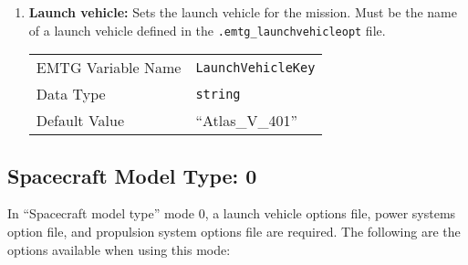 \begin{enumerate}
    \item \textbf{Launch vehicle:} Sets the launch vehicle for the mission. Must be the name of a launch vehicle defined in the {\tt .emtg\_launchvehicleopt} file.
    \begin{table}[H]
        \hspace{2cm}
        \begin{tabular}{lp{5cm}}
        \ac{EMTG} Variable Name & \verb|LaunchVehicleKey| \\
        Data Type & \verb|string| \\
        Default Value & ``Atlas\_V\_401'' \\
        \end{tabular}
    \end{table}
\end{enumerate}



\subsection{Spacecraft Model Type: 0}
In ``Spacecraft model type'' mode 0, a launch vehicle options file, power systems option file, and propulsion system options file are required. The following are the options available when using this mode:\\

